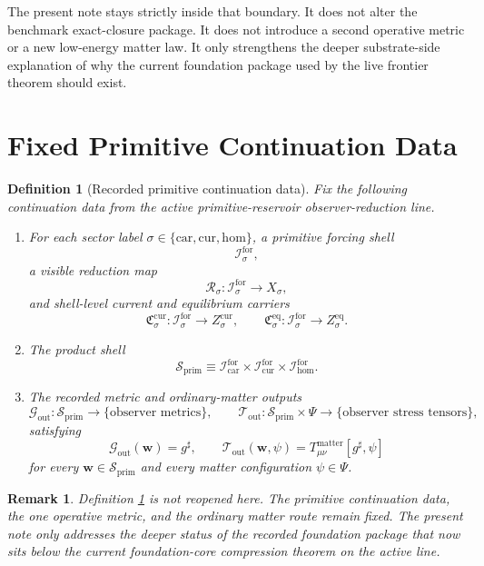 \documentclass[11pt]{article}
\newcommand{\CompletedMetric}{g^{\sharp}}
\newcommand{\MatterSpace}{\Psi}
\newcommand{\Car}{\mathrm{car}}
\newcommand{\Cur}{\mathrm{cur}}
\newcommand{\Hom}{\mathrm{hom}}
\newcommand{\ForSpace}[1]{\mathcal I_{#1}^{\mathrm{for}}}
\newcommand{\PrimShell}{\mathcal S_{\mathrm{prim}}}
\newcommand{\Reduction}[1]{\mathcal R_{#1}}
\newcommand{\CurrentCarrier}[1]{\mathfrak C_{#1}^{\mathrm{cur}}}
\newcommand{\EqCarrier}[1]{\mathfrak C_{#1}^{\mathrm{eq}}}
\newcommand{\MetricOut}{\mathscr G_{\mathrm{out}}}
\newcommand{\MatterOut}{\mathscr T_{\mathrm{out}}}
\newtheorem{definition}{Definition}
\newtheorem{remark}{Remark}
\begin{document}
The present note stays strictly inside that boundary. It does not alter the benchmark exact-closure package. It does not introduce a second operative metric or a new low-energy matter law. It only strengthens the deeper substrate-side explanation of why the current foundation package used by the live frontier theorem should exist.

\section{Fixed Primitive Continuation Data}

\begin{definition}[Recorded primitive continuation data]
\label{def:fixed}
Fix the following continuation data from the active primitive-reservoir observer-reduction line.
\begin{enumerate}
    \item For each sector label \(\sigma\in\{\Car,\Cur,\Hom\}\), a primitive forcing shell
    \[
    \ForSpace{\sigma},
    \]
    a visible reduction map
    \[
    \Reduction{\sigma}:\ForSpace{\sigma}\to X_{\sigma},
    \]
    and shell-level current and equilibrium carriers
    \[
    \CurrentCarrier{\sigma}:\ForSpace{\sigma}\to Z_{\sigma}^{\mathrm{cur}},
    \qquad
    \EqCarrier{\sigma}:\ForSpace{\sigma}\to Z_{\sigma}^{\mathrm{eq}}.
    \]
    \item The product shell
    \[
    \PrimShell
    \equiv
    \ForSpace{\Car}\times \ForSpace{\Cur}\times \ForSpace{\Hom}.
    \]
    \item The recorded metric and ordinary-matter outputs
    \[
    \MetricOut:\PrimShell\to\{\text{observer metrics}\},
    \qquad
    \MatterOut:\PrimShell\times\MatterSpace\to\{\text{observer stress tensors}\},
    \]
    satisfying
    \begin{equation}
    \MetricOut(\mathbf w)=\CompletedMetric,
    \qquad
    \MatterOut(\mathbf w,\psi)
    =
    T_{\mu\nu}^{\mathrm{matter}}[\CompletedMetric,\psi]
    \label{eq:fixedoutputs}
    \end{equation}
    for every \(\mathbf w\in\PrimShell\) and every matter configuration \(\psi\in\MatterSpace\).
\end{enumerate}
\end{definition}

\begin{remark}
Definition \ref{def:fixed} is not reopened here. The primitive continuation data, the one operative metric, and the ordinary matter route remain fixed. The present note only addresses the deeper status of the recorded foundation package that now sits below the current foundation-core compression theorem on the active line.
\end{remark}
\end{document}
